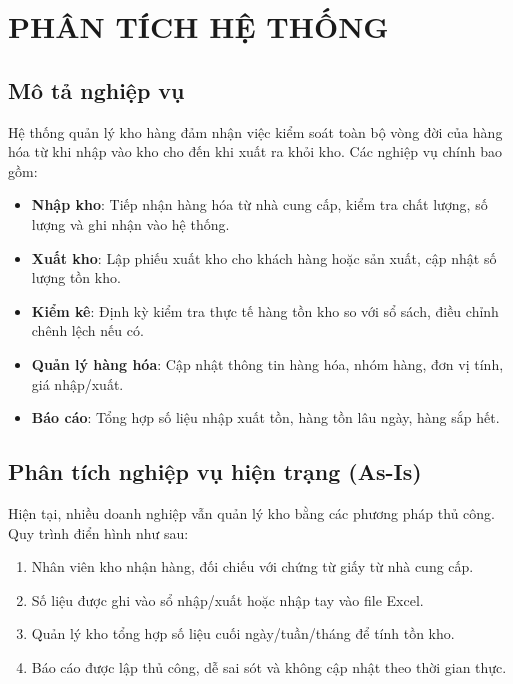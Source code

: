 \chapter{PHÂN TÍCH HỆ THỐNG}

\section{Mô tả nghiệp vụ}

Hệ thống quản lý kho hàng đảm nhận việc kiểm soát toàn bộ vòng đời của hàng hóa từ khi nhập vào kho cho đến khi xuất ra khỏi kho. Các nghiệp vụ chính bao gồm:

\begin{itemize}[leftmargin=1.5cm]
    \item \textbf{Nhập kho}: Tiếp nhận hàng hóa từ nhà cung cấp, kiểm tra chất lượng, số lượng và ghi nhận vào hệ thống.
    \item \textbf{Xuất kho}: Lập phiếu xuất kho cho khách hàng hoặc sản xuất, cập nhật số lượng tồn kho.
    \item \textbf{Kiểm kê}: Định kỳ kiểm tra thực tế hàng tồn kho so với sổ sách, điều chỉnh chênh lệch nếu có.
    \item \textbf{Quản lý hàng hóa}: Cập nhật thông tin hàng hóa, nhóm hàng, đơn vị tính, giá nhập/xuất.
    \item \textbf{Báo cáo}: Tổng hợp số liệu nhập xuất tồn, hàng tồn lâu ngày, hàng sắp hết.
\end{itemize}

\section{Phân tích nghiệp vụ hiện trạng (As-Is)}

Hiện tại, nhiều doanh nghiệp vẫn quản lý kho bằng các phương pháp thủ công. Quy trình điển hình như sau:

\begin{enumerate}[leftmargin=1.5cm]
    \item Nhân viên kho nhận hàng, đối chiếu với chứng từ giấy từ nhà cung cấp.
    \item Số liệu được ghi vào sổ nhập/xuất hoặc nhập tay vào file Excel.
    \item Quản lý kho tổng hợp số liệu cuối ngày/tuần/tháng để tính tồn kho.
    \item Báo cáo được lập thủ công, dễ sai sót và không cập nhật theo thời gian thực.
\end{enumerate}

